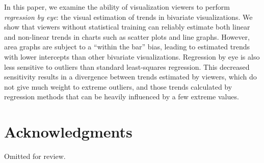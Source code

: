 \documentclass{sigchi}
\begin{document}
In this paper, we examine the ability of visualization viewers to perform \emph{regression by eye}: the visual estimation of trends in bivariate visualizations. We show that viewers without statistical training can reliably estimate both linear and non-linear trends in charts such as scatter plots and line graphs. However, area graphs are subject to a ``within the bar'' bias, leading to estimated trends with lower intercepts than other bivariate visualizations. Regression by eye is also less sensitive to outliers than standard least-squares regression. This decreased sensitivity results in a divergence between trends estimated by viewers, which do not give much weight to extreme outliers, and those trends calculated by regression methods that can be heavily influenced by a few extreme values.


\section{Acknowledgments}

Omitted for review.

%
%
%
%
%
\balance{}




\end{document}
